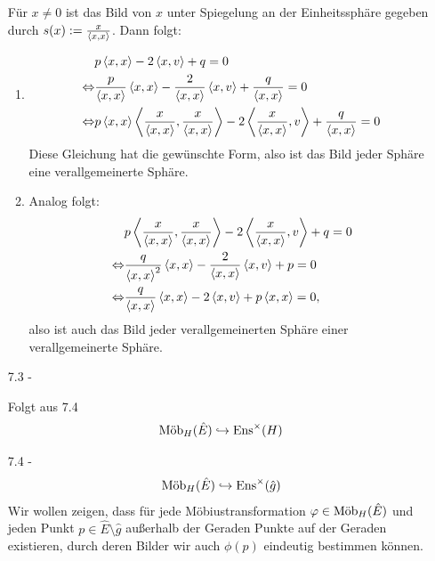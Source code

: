 \documentclass{article}
\begin{document}
\begin{enumerate}
		Für $x \neq 0$ ist das Bild von $x$ unter Spiegelung an der Einheitssphäre gegeben durch $s(x) := \frac{x}{\scalar{x}{x}}$. Dann folgt:
		\begin{enumerate}
			\item
			\begin{align*}
				&p\scalar{x}{x} - 2\scalar{x}{v} + q = 0\\
				\Leftrightarrow
				&\frac{p}{\scalar{x}{x}}\scalar{x}{x} - \frac{2}{\scalar{x}{x}}\scalar{x}{v} + \frac{q}{\scalar{x}{x}} = 0\\
				\Leftrightarrow
				&p\scalar{x}{x}\scalar{\frac{x}{\scalar{x}{x}}}{\frac{x}{\scalar{x}{x}}} - 2 \scalar{\frac{x}{\scalar{x}{x}}}{v} + \frac{q}{\scalar{x}{x}} = 0
			\end{align*}
			Diese Gleichung hat die gewünschte Form, also ist das Bild jeder Sphäre eine verallgemeinerte Sphäre.
			\item Analog folgt:
			\begin{align*}
				&p\scalar{\frac{x}{\scalar{x}x}}{\frac{x}{\scalar{x}x}} - 2 \scalar{\frac{x}{\scalar{x}x}}{v} + q = 0\\
				\Leftrightarrow
				&\frac{q}{\scalar{x}{x}^2}\scalar{x}{x} - \frac{2}{\scalar{x}{x}}\scalar{x}{v} + p = 0\\
				\Leftrightarrow
				&\frac{q}{\scalar{x}{x}}\scalar{x}{x} - 2\scalar{x}{v} + p\scalar{x}{x} = 0,
			\end{align*}	
			also ist auch das Bild jeder verallgemeinerten Sphäre einer verallgemeinerte Sphäre.
		\end{enumerate}
		
		\item[7.3 - \tbf{3}]
		
		Folgt aus 7.4
		\begin{align*}
			\textnormal{Möb}_H(\hat E) \hookrightarrow \textnormal{Ens}^\times(H)
		\end{align*}
		\item[7.4 - \tbf{3}]
		\begin{align*}
			\textnormal{Möb}_H(\hat E) \hookrightarrow \textnormal{Ens}^\times(\hat g)
		\end{align*}
		Wir wollen zeigen, dass für jede Möbiustransformation $\varphi \in \textnormal{Möb}_H(\hat E)$ und jeden Punkt $p \in \hat E \setminus \hat g$ außerhalb der Geraden Punkte auf der Geraden existieren, durch deren Bilder wir auch $\phi(p)$ eindeutig bestimmen können. 
		

\end{enumerate}
\end{document}
